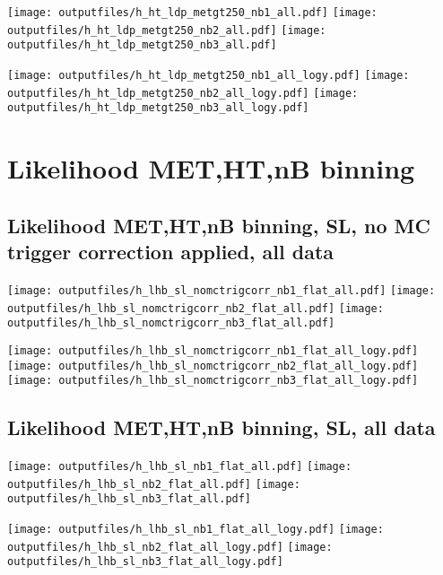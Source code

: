 \documentclass[11pt]{article}
\begin{document}
    \noindent
     \texttt{[image: outputfiles/h\_ht\_ldp\_metgt250\_nb1\_all.pdf]}
     \texttt{[image: outputfiles/h\_ht\_ldp\_metgt250\_nb2\_all.pdf]}
     \texttt{[image: outputfiles/h\_ht\_ldp\_metgt250\_nb3\_all.pdf]}

    \noindent
     \texttt{[image: outputfiles/h\_ht\_ldp\_metgt250\_nb1\_all\_logy.pdf]}
     \texttt{[image: outputfiles/h\_ht\_ldp\_metgt250\_nb2\_all\_logy.pdf]}
     \texttt{[image: outputfiles/h\_ht\_ldp\_metgt250\_nb3\_all\_logy.pdf]}




   \section{Likelihood MET,HT,nB binning}
    \subsection{ Likelihood MET,HT,nB binning, SL, no MC trigger correction applied, all data}

    \noindent
     \texttt{[image: outputfiles/h\_lhb\_sl\_nomctrigcorr\_nb1\_flat\_all.pdf]}
     \texttt{[image: outputfiles/h\_lhb\_sl\_nomctrigcorr\_nb2\_flat\_all.pdf]}
     \texttt{[image: outputfiles/h\_lhb\_sl\_nomctrigcorr\_nb3\_flat\_all.pdf]}

    \noindent
     \texttt{[image: outputfiles/h\_lhb\_sl\_nomctrigcorr\_nb1\_flat\_all\_logy.pdf]}
     \texttt{[image: outputfiles/h\_lhb\_sl\_nomctrigcorr\_nb2\_flat\_all\_logy.pdf]}
     \texttt{[image: outputfiles/h\_lhb\_sl\_nomctrigcorr\_nb3\_flat\_all\_logy.pdf]}


    \subsection{ Likelihood MET,HT,nB binning, SL, all data}

    \noindent
     \texttt{[image: outputfiles/h\_lhb\_sl\_nb1\_flat\_all.pdf]}
     \texttt{[image: outputfiles/h\_lhb\_sl\_nb2\_flat\_all.pdf]}
     \texttt{[image: outputfiles/h\_lhb\_sl\_nb3\_flat\_all.pdf]}

    \noindent
     \texttt{[image: outputfiles/h\_lhb\_sl\_nb1\_flat\_all\_logy.pdf]}
     \texttt{[image: outputfiles/h\_lhb\_sl\_nb2\_flat\_all\_logy.pdf]}
     \texttt{[image: outputfiles/h\_lhb\_sl\_nb3\_flat\_all\_logy.pdf]}
\end{document}
